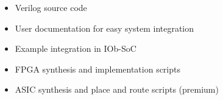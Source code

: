 \begin{itemize}
\item Verilog source code
\item User documentation for easy system integration
\item Example integration in IOb-SoC
\item FPGA synthesis and implementation scripts
\item ASIC synthesis and place and route scripts (premium)
\end{itemize}
